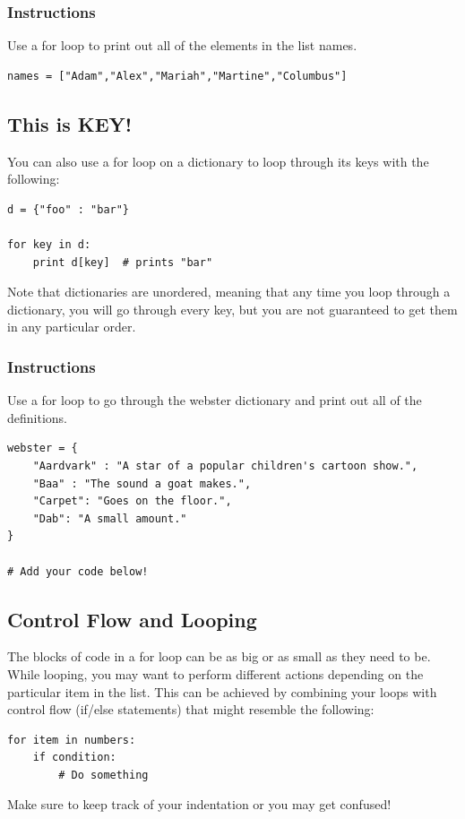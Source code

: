 \documentclass[12pt,a4paper,final,twoside,onecolumn,titlepage]{book}
\begin{document}
\subsubsection{Instructions}
Use a for loop to print out all of the elements in the list names.

\begin{lstlisting}
names = ["Adam","Alex","Mariah","Martine","Columbus"]
\end{lstlisting}

\subsection{This is KEY!}

You can also use a for loop on a dictionary to loop through its keys with the following:
\begin{lstlisting}
d = {"foo" : "bar"}

for key in d: 
    print d[key]  # prints "bar" 
\end{lstlisting}
Note that dictionaries are unordered, meaning that any time you loop through a dictionary, you will go through every key, but you are not guaranteed to get them in any particular order.
\subsubsection{Instructions}

Use a for loop to go through the webster dictionary and print out all of the definitions.

\begin{lstlisting}
webster = {
	"Aardvark" : "A star of a popular children's cartoon show.",
    "Baa" : "The sound a goat makes.",
    "Carpet": "Goes on the floor.",
    "Dab": "A small amount."
}

# Add your code below!

\end{lstlisting}

\subsection{Control Flow and Looping}

The blocks of code in a for loop can be as big or as small as they need to be. While looping, you may want to perform different actions depending on the particular item in the list. This can be achieved by combining your loops with control flow (if/else statements) that might resemble the following:
\begin{lstlisting}
for item in numbers: 
    if condition: 
        # Do something
\end{lstlisting}
Make sure to keep track of your indentation or you may get confused!
\end{document}
